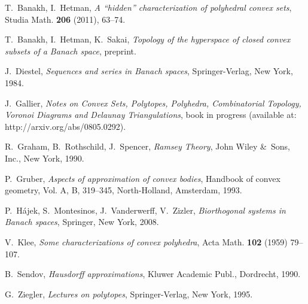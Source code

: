 \documentclass{amsart}
\theoremstyle{definition}
\begin{document}
\begin{thebibliography}{}

 T.~Banakh, I.~Hetman, {\em A ``hidden'' characterization of polyhedral convex sets}, Studia Math. {\bf 206} (2011), 63--74.

 T.~Banakh, I.~Hetman, K.~Sakai, {\em Topology of the hyperspace of closed convex subsets of a Banach space}, preprint.

 J.~Diestel, {\em Sequences and series in Banach spaces}, Springer-Verlag, New York, 1984.

 J.~Gallier, {\em Notes on Convex Sets, Polytopes, Polyhedra,
Combinatorial Topology, Voronoi Diagrams and
Delaunay Triangulations}, book in progress (available at: http://arxiv.org/abs/0805.0292).

 R.~Graham, B.~Rothschild, J.~Spencer, {\em Ramsey Theory}, John Wiley \&\ Sons, Inc., New York, 1990.

 P.~Gruber, {\em Aspects of approximation of convex bodies}, Handbook of convex geometry, Vol. A, B, 319--345, North-Holland, Amsterdam, 1993.

 P.~H\'ajek, S.~Montesinos, J.~Vanderwerff, V.~Zizler, {\em Biorthogonal systems in Banach spaces}, Springer, New York, 2008.

 V.~Klee, {\em Some characterizations of convex polyhedra},
Acta Math. {\bf 102} (1959) 79--107.

 B.~Sendov, {\em Hausdorff approximations}, Kluwer Academic Publ., Dordrecht, 1990.

 G.~Ziegler, {\em Lectures on polytopes}, Springer-Verlag, New York, 1995.

\end{thebibliography}
\end{document}
